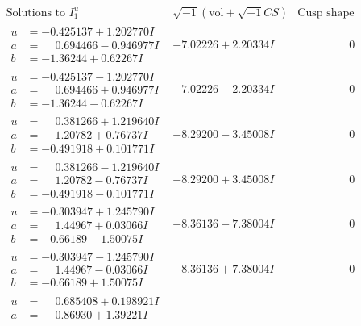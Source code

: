 \documentclass[1p]{elsarticle_modified}
\theoremstyle{definition}
\newcommand{\I}{\sqrt{-1}}
\begin{document}
$$\begin{array}{c|c|c}
\text{Solutions to }I^u_{1}& \I (\text{vol} + \sqrt{-1}CS) & \text{Cusp shape}\\
 \hline 
\begin{aligned}
u &= -0.425137 + 1.202770 I \\
a &= \phantom{-}0.694466 - 0.946977 I \\
b &= -1.36244 + 0.62267 I\end{aligned}
 & -7.02226 + 2.20334 I & \phantom{-0.000000 } 0 \\ \hline\begin{aligned}
u &= -0.425137 - 1.202770 I \\
a &= \phantom{-}0.694466 + 0.946977 I \\
b &= -1.36244 - 0.62267 I\end{aligned}
 & -7.02226 - 2.20334 I & \phantom{-0.000000 } 0 \\ \hline\begin{aligned}
u &= \phantom{-}0.381266 + 1.219640 I \\
a &= \phantom{-}1.20782 + 0.76737 I \\
b &= -0.491918 + 0.101771 I\end{aligned}
 & -8.29200 - 3.45008 I & \phantom{-0.000000 } 0 \\ \hline\begin{aligned}
u &= \phantom{-}0.381266 - 1.219640 I \\
a &= \phantom{-}1.20782 - 0.76737 I \\
b &= -0.491918 - 0.101771 I\end{aligned}
 & -8.29200 + 3.45008 I & \phantom{-0.000000 } 0 \\ \hline\begin{aligned}
u &= -0.303947 + 1.245790 I \\
a &= \phantom{-}1.44967 + 0.03066 I \\
b &= -0.66189 - 1.50075 I\end{aligned}
 & -8.36136 - 7.38004 I & \phantom{-0.000000 } 0 \\ \hline\begin{aligned}
u &= -0.303947 - 1.245790 I \\
a &= \phantom{-}1.44967 - 0.03066 I \\
b &= -0.66189 + 1.50075 I\end{aligned}
 & -8.36136 + 7.38004 I & \phantom{-0.000000 } 0 \\ \hline\begin{aligned}
u &= \phantom{-}0.685408 + 0.198921 I \\
a &= \phantom{-}0.86930 + 1.39221 I \\

\end{aligned}
\end{array}$$
\end{document}
